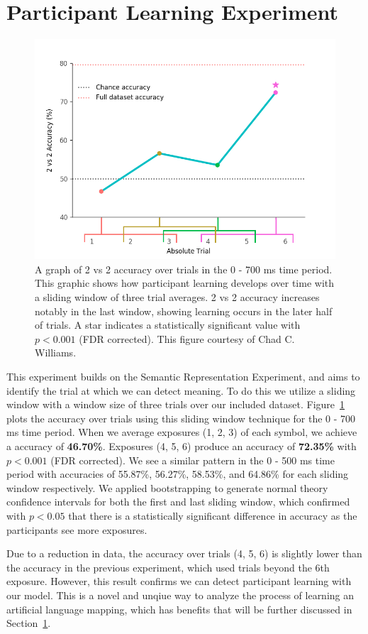 \section{Participant Learning Experiment}
\label{sec:results:participantlearning}

\begin{figure}[t]
  \centering
  \includegraphics[width=0.75\linewidth]{figures/learning}
  \caption[\tvt Accuracy over Trials]{
    A graph of 2 vs 2 accuracy over trials in the 0 - 700 ms time period. This 
    graphic shows how participant learning develops over time with a sliding 
    window of three trial averages.  2 vs 2 accuracy increases notably in the 
    last window, showing learning occurs in the later half of trials. A star 
    indicates a statistically significant value with $p < 0.001$ (FDR 
    corrected). This figure courtesy of Chad C. Williams.
  }
  \label{fig:learning}
\end{figure}

This experiment builds on the Semantic Representation Experiment, and aims to 
identify the trial at which we can detect meaning. To do this we utilize a 
sliding window with a window size of three trials over our included dataset.   
Figure~\ref{fig:learning} plots the \tvt accuracy over trials using this 
sliding window technique for the 0 - 700 ms time period. When we average 
exposures (1, 2, 3) of each symbol, we achieve a \tvt accuracy of 
\textbf{46.70\%}.  Exposures (4, 5, 6) produce an accuracy of \textbf{72.35\%} 
with $p < 0.001$ (FDR corrected). We see a similar pattern in the 0 - 500 ms 
time period with accuracies of 55.87\%, 56.27\%, 58.53\%, and 64.86\% for each 
sliding window respectively. We applied bootstrapping to generate normal theory 
confidence intervals for both the first and last sliding window, which 
confirmed with $p < 0.05$ that there is a statistically significant difference 
in \tvt accuracy as the participants see more exposures.

Due to a reduction in data, the \tvt accuracy over trials (4, 5, 6) is slightly 
lower than the \tvt accuracy in the previous experiment, which used trials 
beyond the 6th exposure. However, this result confirms we can detect 
participant learning with our model. This is a novel and unqiue way to analyze 
the process of learning an artificial language mapping, which has benefits that 
will be further discussed in Section~\ref{sec:results:participantlearning}.
